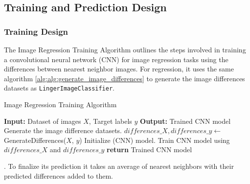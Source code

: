 \documentclass[a4paper, 12pt]{report}
\begin{document}
\subsection{Training and Prediction Design}
\subsubsection{Training Design}

The Image Regression Training Algorithm outlines the steps involved in training a convolutional neural network (CNN) for image 
regression tasks using the differences between nearest neighbor images.
For regression, it uses the same algorithm \ref{alg:alg:generate_image_differences} to generate the image differences datasets as \texttt{LingerImageClassifier}.
\begin{algorithm}
    \caption{Image Regression Training Algorithm}
    \label{alg:image_regression_training}
    \begin{algorithmic}
            \State \textbf{Input:} Dataset of images $X$, Target labels $y$
            \State \textbf{Output:} Trained CNN model
            \State Generate the image difference datasets.
            \State $differences\_X, differences\_y \gets$ GenerateDifferences($X$, $y$) 
            \State Initialize (CNN) model. 
            \State Train CNN model using $differences\_X$ and $differences\_y$
            \State \textbf{return} Trained CNN model
        \EndFunction
    \end{algorithmic}
\end{algorithm}
. 
To finalize its prediction it takes an average of nearest neighbors with their
predicted differences added to them.
\end{document}
